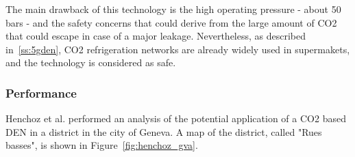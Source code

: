 \documentclass{article}
\begin{document}
The main drawback of this technology is the high operating pressure - about 50 bars - and the safety concerns that could derive from the large amount of CO2 that could escape in case of a major leakage. Nevertheless, as described in~\ref{ss:5gden}, CO2 refrigeration networks are already widely used in supermakets, and the technology is considered as safe. \\


\subsubsection{Performance}
Henchoz et al.\cite{henchozPotentialRefrigerantBased2016} performed an analysis of the potential application of a CO2 based DEN in a district in the city of Geneva. A map of the district, called "Rues basses", is shown in Figure~\ref{fig:henchoz_gva}.
\end{document}
